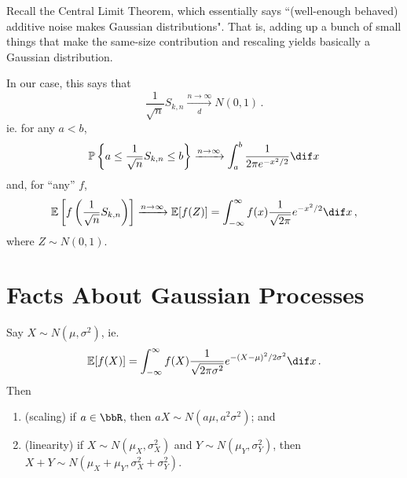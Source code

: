 \documentclass[../../../Master/AppliedStochastics.tex]{subfiles}
\begin{document}
Recall the Central Limit Theorem, which essentially says
    ``(well-enough behaved) additive noise makes Gaussian distributions".
That is, adding up a bunch of small things that make the same-size contribution
    and rescaling yields basically a Gaussian distribution.


In our case, this says that 
\begin{equation*}
    \frac{1}{\sqrt{n}}S_{k,n}\xrightarrow[d]{n\to\infty} N(0,1)\,.
\end{equation*}
    ie. for any $a < b$,
\begin{equation*}
    \P\left\{a \leq \frac{1}{\sqrt{n}} S_{k, n} \leq b\right\}
        \xrightarrow{n\to\infty} \int_a^b \frac{1}{2\pi e^{-x^2/2}} \dif x
\end{equation*}
    and, for ``any'' $f$, 
\begin{equation}
    \E\left[f \left(\frac{1}{\sqrt{n}} S_{k, n}\right)\right]
        \xrightarrow{n\to\infty} \E[f(Z)]
        = \int_{-\infty}^\infty f(x) \frac{1}{\sqrt{2\pi}} e^{-x^2/2} \dif x\,,
\end{equation}
    where $Z\sim N(0,1)$.


\section{Facts About Gaussian Processes}


Say $X \sim N(\mu, \sigma^2)$,
    ie.
\begin{equation*}
    \E[f(X)] = \int_{-\infty}^\infty f(X)
        \frac{1}{\sqrt{2\pi\sigma^2}} e^{- (X - \mu)^2 / 2\sigma^2} \dif x\,.
\end{equation*}
Then 
\begin{enumerate}
    \item (scaling)
    if $a \in \bbR$, then $a X \sim N(a \mu, a^2 \sigma^2)$; and
    
    \item (linearity)
    if $X \sim N(\mu_X, \sigma_X^2)$ and $Y \sim N(\mu_Y, \sigma_Y^2)$,
        then $X + Y\sim N(\mu_X + \mu_Y,\sigma_X^2 + \sigma_Y^2)$.
\end{enumerate}
\end{document}
